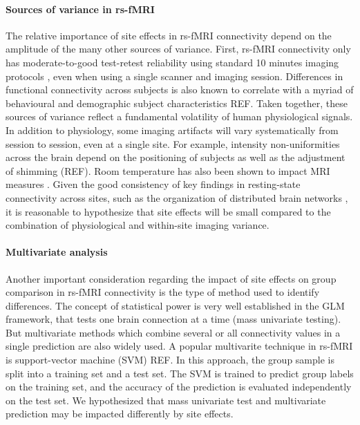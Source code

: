 \documentclass[authoryear]{elsarticle}
\begin{document}
\paragraph{Sources of variance in rs-fMRI}
The relative importance of site effects in rs-fMRI connectivity depend on the amplitude of the many other sources of variance. First, rs-fMRI connectivity only has moderate-to-good test-retest reliability using standard 10 minutes imaging protocols \citep{Shehzad2009}, even when using a single scanner and imaging session. Differences in functional connectivity across subjects is also known to correlate with a myriad of behavioural and demographic subject characteristics REF. Taken together, these sources of variance reflect a fundamental volatility of human physiological signals. In addition to physiology, some imaging artifacts will vary systematically from session to session, even at a single site. For example, intensity non-uniformities across the brain depend on the positioning of subjects as well as the adjustment of shimming (REF). Room temperature has also been shown to impact MRI measures \citep{Vanhoutte2006}. Given the good consistency of key findings in resting-state connectivity across sites, such as the organization of distributed brain networks \citep{Biswal2010}, it is reasonable to hypothesize that site effects will be small compared to the combination of physiological and within-site imaging variance. 

\paragraph{Multivariate analysis}
Another important consideration regarding the impact of site effects on group comparison in rs-fMRI connectivity is the type of method used to identify differences. The concept of statistical power is very well established in the GLM framework, that tests one brain connection at a time (mass univariate testing). But multivariate methods which combine several or all connectivity values in a single prediction are also widely used. A popular multivarite technique in rs-fMRI is support-vector machine (SVM) REF. In this approach, the group sample is split into a training set and a test set. The SVM is trained to predict group labels on the training set, and the accuracy of the prediction is evaluated independently on the test set. We hypothesized that mass univariate test and multivariate prediction may be impacted differently by site effects. 
\end{document}
